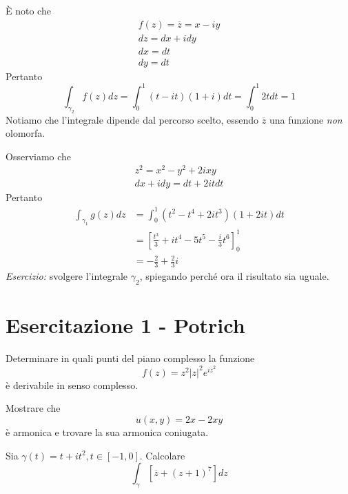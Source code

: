 \Soluzione

È noto che
\begin{gather*}
f(z) = \overline{z} = x - iy\\
dz = dx + idy\\
dx = dt\\
dy = dt
\end{gather*}
Pertanto
\begin{equation*}
\int_{\gamma_{2}} f(z)dz = \int^{1}_{0} (t - it)(1 + i)dt = \int^{1}_{0} 2tdt = 1
\end{equation*}
Notiamo che l'integrale dipende dal percorso scelto, essendo $\overline{z}$ una funzione \textit{non} olomorfa.

\Soluzione

Osserviamo che
\begin{gather*}
z^{2} = x^{2} - y^{2} + 2ixy\\
dx + idy = dt + 2itdt
\end{gather*}
Pertanto
\begin{align*}
\int_{\gamma_{1}} g(z)dz & = \int^{1}_{0}\left(t^{2} - t^{4} + 2it^{3}\right) (1 + 2it)dt\\
 & = \left[\frac{t^{3}}{3} + it^{4} - 5t^{5} - \frac{i}{3} t^{6}\right]^{1}_{0}\\
 & = - \frac{2}{3} + \frac{2}{3} i
\end{align*}
\textit{Esercizio:} svolgere l'integrale $\gamma_{2}$, spiegando perché ora il risultato sia uguale.
\chapter{Esercitazione 1 - Potrich}

\ParteEsercizi

\Esercizio{}

Determinare in quali punti del piano complesso la funzione
\begin{equation*}
f(z) = z^{2}\left| z\right|^{2} e^{i\overline{z}^{2}}
\end{equation*}
è derivabile in senso complesso.

\Esercizio{}

Mostrare che
\begin{equation*}
u\left(x, y\right) = 2x - 2xy
\end{equation*}
è armonica e trovare la sua armonica coniugata.

\Esercizio{}

Sia $\gamma (t) = t + it^{2}, t\in \left[ - 1, 0\right]$. Calcolare
\begin{equation*}
\int\nolimits_{\gamma}\left[\overline{z} + \left(z + 1\right)^{7}\right] dz
\end{equation*}


